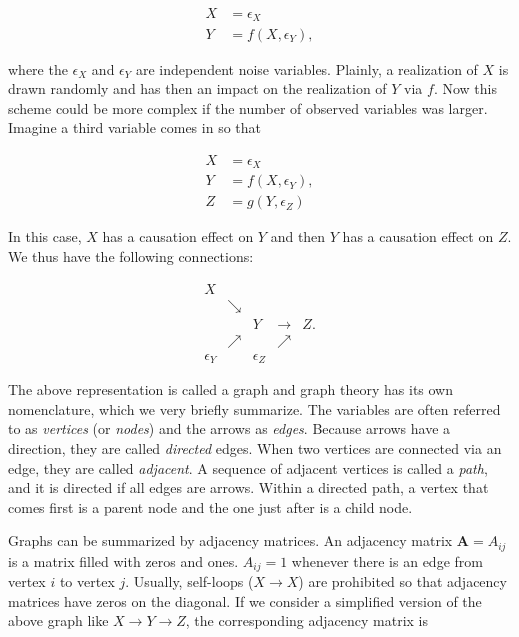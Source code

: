 \begin{align*}
X&=\epsilon_X \\
Y&=f(X,\epsilon_Y),
\end{align*}

where the $\epsilon_X$ and $\epsilon_Y$ are independent noise variables. Plainly, a realization of $X$ is drawn randomly and has then an impact on the realization of $Y$ via $f$. Now this scheme could be more complex if the number of observed variables was larger. Imagine a third variable comes in so that

\begin{align*}
X&=\epsilon_X \\
Y&=f(X,\epsilon_Y),\\
Z&=g(Y,\epsilon_Z)
\end{align*}

In this case, $X$ has a causation effect on $Y$ and then $Y$ has a causation effect on $Z$. We thus have the following connections:

\begin{equation}
\begin{array}{ccccccc} X & &&&\\
&\searrow & &&\\
&&Y&\rightarrow&Z. \\
&\nearrow &&\nearrow& \\
\epsilon_Y & &\epsilon_Z
\end{array}
\end{equation}

The above representation is called a graph and graph theory has its own nomenclature, which we very briefly summarize. The variables are often referred to as \textit{vertices} (or \textit{nodes}) and the arrows as \textit{edges}. Because arrows have a direction, they are called \textit{directed} edges. When two vertices are connected via an edge, they are called \textit{adjacent}. A sequence of adjacent vertices is called a \textit{path}, and it is directed if all edges are arrows. Within a directed path, a vertex that comes first is a parent node and the one just after is a child node.

Graphs can be summarized by adjacency matrices. An adjacency matrix $\textbf{A}=A_{ij}$ is a matrix filled with zeros and ones. $A_{ij}=1$ whenever there is an edge from vertex $i$ to vertex $j$. Usually, self-loops ($X \rightarrow X$) are prohibited so that adjacency matrices have zeros on the diagonal. If we consider a simplified version of the above graph like $X \rightarrow Y \rightarrow Z$, the corresponding adjacency matrix is

